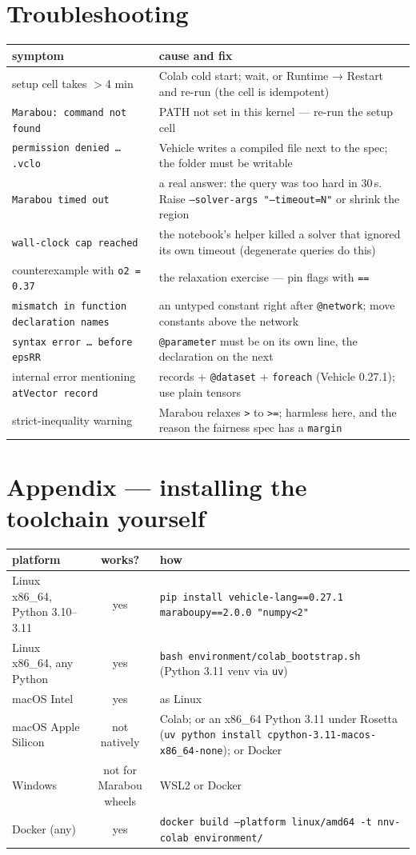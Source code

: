 \documentclass[11pt]{article}
\begin{document}
\section{Troubleshooting}
\begin{tabularx}{\textwidth}{@{}lX@{}}
\toprule
symptom & cause and fix\\
\midrule
setup cell takes $>$4 min & Colab cold start; wait, or Runtime → Restart and re-run (the cell is idempotent)\\
\texttt{Marabou: command not found} & PATH not set in this kernel — re-run the setup cell\\
\texttt{permission denied … .vclo} & Vehicle writes a compiled file next to the spec; the folder must be writable\\
\texttt{Marabou timed out} & a real answer: the query was too hard in 30\,s. Raise \texttt{--solver-args "--timeout=N"} or shrink the region\\
\texttt{wall-clock cap reached} & the notebook's helper killed a solver that ignored its own timeout (degenerate queries do this)\\
counterexample with \texttt{o2 = 0.37} & the relaxation exercise — pin flags with \texttt{==}\\
\texttt{mismatch in function declaration names} & an untyped constant right after \texttt{@network}; move constants above the network\\
\texttt{syntax error … before epsRR} & \texttt{@parameter} must be on its own line, the declaration on the next\\
internal error mentioning \texttt{atVector record} & records + \texttt{@dataset} + \texttt{foreach} (Vehicle 0.27.1); use plain tensors\\
strict-inequality warning & Marabou relaxes \texttt{>} to \texttt{>=}; harmless here, and the reason the fairness spec has a \texttt{margin}\\
\bottomrule
\end{tabularx}

\section*{Appendix — installing the toolchain yourself}
\begin{tabularx}{\textwidth}{@{}lcX@{}}
\toprule
platform & works? & how\\
\midrule
Linux x86\_64, Python 3.10–3.11 & yes & \texttt{pip install vehicle-lang==0.27.1 maraboupy==2.0.0 "numpy<2"}\\
Linux x86\_64, any Python & yes & \texttt{bash environment/colab\_bootstrap.sh} (Python 3.11 venv via \texttt{uv})\\
macOS Intel & yes & as Linux\\
macOS Apple Silicon & not natively & Colab; or an x86\_64 Python 3.11 under Rosetta (\texttt{uv python install cpython-3.11-macos-x86\_64-none}); or Docker\\
Windows & not for Marabou wheels & WSL2 or Docker\\
Docker (any) & yes & \texttt{docker build --platform linux/amd64 -t nnv-colab environment/}\\
\bottomrule
\end{tabularx}
\end{document}
